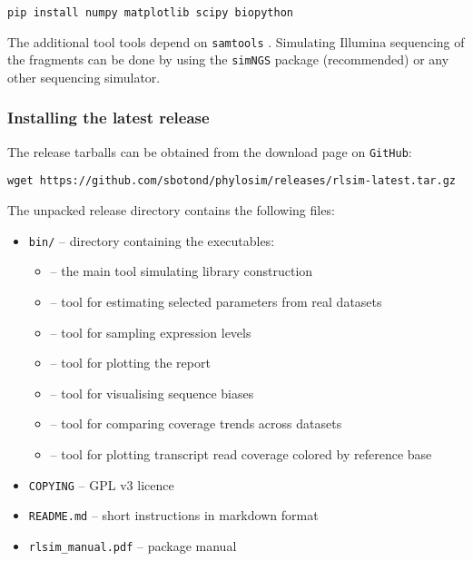 \begin{verbatim}
pip install numpy matplotlib scipy biopython
\end{verbatim}

The additional tool \plotCov tools depend on {\tt samtools} \cite{samtools}.
Simulating Illumina sequencing of the fragments can be done by using the {\tt simNGS} package \cite{simngs} (recommended) or any other sequencing simulator.

\subsubsection{Installing the latest release}
\label{sss:release_inst}

The release tarballs can be obtained from the \rlsim download \cite{rlsim_down} page on \texttt{GitHub}:

\begin{verbatim}
wget https://github.com/sbotond/phylosim/releases/rlsim-latest.tar.gz
\end{verbatim}

The unpacked release directory contains the following files:

\begin{itemize}
    \item{{\tt bin/} -- directory containing the executables:
        \begin{itemize}
            \item[]{\rlsim -- the main tool simulating library construction}
            \item[]{\effest -- tool for estimating selected parameters from real datasets}
            \item[]{\sel -- tool for sampling expression levels}
            \item[]{\plotRlsim -- tool for plotting the \rlsim report}
            \item[]{\pbPlot -- tool for visualising sequence biases}
            \item[]{\covCmp -- tool for comparing coverage trends across datasets}
            \item[]{\plotCov -- tool for plotting transcript read coverage colored by reference base}
        \end{itemize}
    }
    \item {\tt COPYING} -- GPL v3 licence
    \item {\tt README.md} -- short instructions in markdown format
    \item {\tt rlsim\_manual.pdf} -- package manual
\end{itemize}

